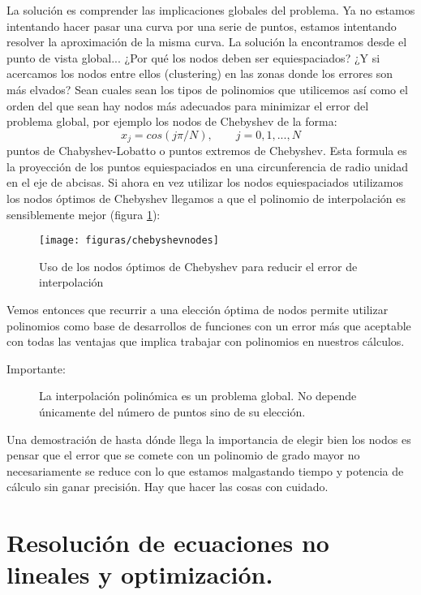 La solución es comprender las implicaciones globales del problema.  Ya
no estamos intentando hacer pasar una curva por una serie de puntos,
estamos intentando resolver la aproximación de la misma curva. La
solución la encontramos desde el punto de vista global... ¿Por qué los
nodos deben ser equiespaciados? ¿Y si acercamos los nodos entre ellos
(clustering) en las zonas donde los errores son más elvados?  Sean
cuales sean los tipos de polinomios que utilicemos así como el orden
del que sean hay nodos más adecuados para minimizar el error del
problema global, por ejemplo los nodos de Chebyshev de la forma:
$$x_{j}=cos(j\pi/N),\qquad j=0,1,...,N$$
puntos de Chabyshev-Lobatto o puntos extremos de Chebyshev. Esta
formula es la proyección de los puntos equiespaciados en una
circunferencia de radio unidad en el eje de abcisas. Si ahora en vez
utilizar los nodos equiespaciados utilizamos los nodos óptimos de
Chebyshev llegamos a que el polinomio de interpolación es
sensiblemente mejor (figura \ref{cap:chebyshev}):

%
\begin{figure}[h]
  \centering{}

  \texttt{[image: figuras/chebyshevnodes]}


  \caption{\label{cap:chebyshev}Uso de los nodos óptimos de Chebyshev
    para reducir el error de interpolación}
\end{figure}


Vemos entonces que recurrir a una elección óptima de nodos permite
utilizar polinomios como base de desarrollos de funciones con un error
más que aceptable con todas las ventajas que implica trabajar con
polinomios en nuestros cálculos.

\begin{description}
\item [Importante:]La interpolación polinómica es un problema global.
  No depende únicamente del número de puntos sino de su elección.
\end{description}
Una demostración de hasta dónde llega la importancia de elegir bien
los nodos es pensar que el error que se comete con un polinomio de
grado mayor no necesariamente se reduce con lo que estamos malgastando
tiempo y potencia de cálculo sin ganar precisión. Hay que hacer las
cosas con cuidado.


\section{Resolución de ecuaciones no lineales y optimización.}

